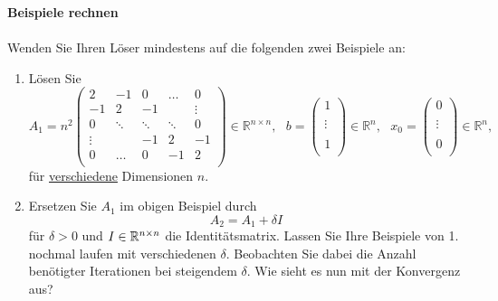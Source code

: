 \textbf{Beispiele rechnen}\\
~\\
Wenden Sie Ihren Löser \textbf{} mindestens auf die folgenden zwei Beispiele an:
\begin{enumerate}
	\item Lösen Sie	$$
		      A_1 = n^2 \left(\begin{array}{rrrrr}
				      2      & -1     & 0      & \hdots & 0      \\
				      -1     & 2      & -1     &        & \vdots \\
				      0      & \ddots & \ddots & \ddots & 0      \\
				      \vdots &        & -1     & 2      & -1     \\
				      0      & \hdots & 0      & -1     & 2      \\
			      \end{array}\right)\in \mathbb{R}^{n \times n},~~~
		      b = \left(\begin{array}{rrrrr}
				      1      \\
				      \\
				      \vdots \\
				      \\
				      1      \\
			      \end{array}\right) \in \mathbb{R}^{n}, ~~~x_0 =  \left(\begin{array}{rrrrr}
				      0      \\
				      \\
				      \vdots \\
				      \\
				      0      \\
			      \end{array}\right) \in \mathbb{R}^{n},$$ 	für \underline{verschiedene} Dimensionen $n$.
	\item Ersetzen Sie $A_1$ im obigen Beispiel durch
	      $$
		      A_2 = A_1 + \delta I$$
	      für $\delta > 0$ und $I \in {\mathbb{R}}^{n\times n}$ die Identitätsmatrix. Lassen Sie Ihre Beispiele von 1. nochmal laufen mit verschiedenen $\delta$.   Beobachten Sie dabei die Anzahl benötigter Iterationen bei steigendem $\delta$. Wie sieht es nun mit der Konvergenz aus?
\end{enumerate}
